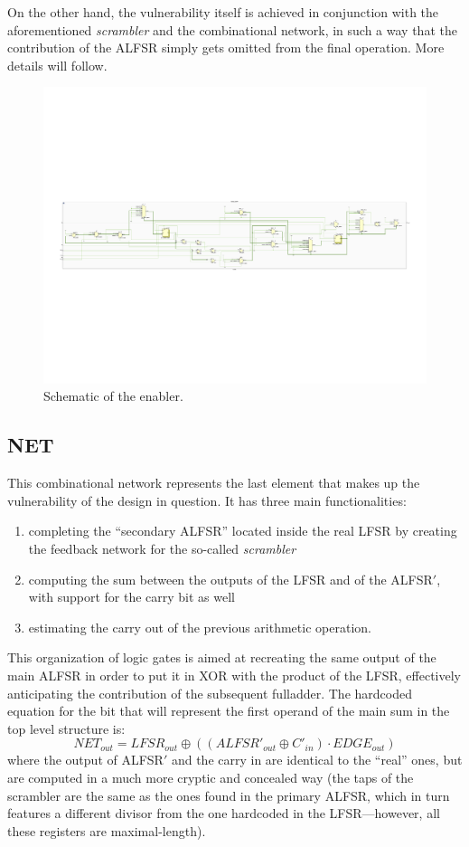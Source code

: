 On the other hand, the vulnerability itself is achieved in conjunction with the aforementioned \emph{scrambler} and the combinational network, in such a way that the contribution of the ALFSR simply gets omitted from the final operation. More details will follow.
\begin{figure}[!ht]
\vspace{0.5cm}
\includegraphics[width=\textwidth]{images/enabler.png}
\caption{Schematic of the enabler.}
\end{figure}
\subsection{NET}
This combinational network represents the last element that makes up the vulnerability of the design in question. It has three main functionalities:
\begin{enumerate}
\item completing the ``secondary ALFSR'' located inside the real LFSR by creating the feedback network for the so-called \emph{scrambler}
\item computing the sum between the outputs of the LFSR and of the ALFSR$'$, with support for the carry bit as well
\item estimating the carry out of the previous arithmetic operation.
\end{enumerate}

This organization of logic gates is aimed at recreating the same output of the main ALFSR in order to put it in XOR with the product of the LFSR, effectively anticipating the contribution of the subsequent fulladder.
The hardcoded equation for the bit that will represent the first operand of the main sum in the top level structure is:
\begin{equation}
NET_{out}=LFSR_{out}\oplus \left((ALFSR'_{out}\oplus C'_{in})\cdot EDGE_{out}\right)
\end{equation}
where the output of ALFSR$'$ and the carry in are identical to the ``real'' ones, but are computed in a much more cryptic and concealed way (the taps of the scrambler are the same as the ones found in the primary ALFSR, which in turn features a different divisor from the one hardcoded in the LFSR---however, all these registers are maximal-length).

